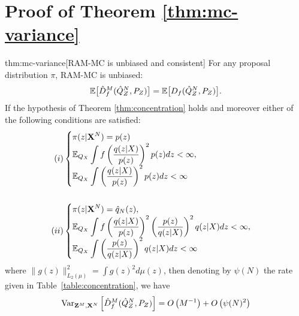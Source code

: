 \section{Proof of Theorem \ref{thm:mc-variance}}\label{appendix:full-statment-proof-mc}

\begin{reptheorem}{thm:mc-variance}[RAM-MC is unbiased and consistent]
For any proposal distribution $\pi$, RAM-MC is unbiased:
%
\begin{align*}
\mathbb{E}\bigl[\hat{D}^M_f( \hat{Q}_Z^N , P_Z)\bigr] =\mathbb{E}\bigl[D_f( \hat{Q}^N_{Z} , P_Z )\bigr].
\end{align*}
%
If the hypothesis of Theorem \ref{thm:concentration} holds and moreover either of the following conditions are satisfied:
\begin{align*}
(i)& \begin{cases}
\displaystyle \pi(z|\mathbf{X}^N) = p(z) \\
\displaystyle \mathbb{E}_{Q_X} \int f\left( \frac{q(z|X)}{p(z)}\right)^2 p(z) dz  < \infty, \\
\displaystyle \mathbb{E}_{Q_X} \int \left( \frac{q(z|X)}{p(z)} \right)^2 p(z) dz < \infty
\end{cases}\\ \ \\
(ii)& \begin{cases}
\displaystyle \pi(z | \mathbf{X}^N) = \hat{q}_N(z), \\
\displaystyle \mathbb{E}_{Q_X} \int f\left( \frac{q(z|X)}{p(z)}\right)^2 \left(\frac{p(z)}{q(z|X)}\right)^2 q(z|X) dz < \infty, \\
\displaystyle \mathbb{E}_{Q_X} \int \left(\frac{p(z)}{q(z|X)} \right)^2 q(z|X) dz < \infty
\end{cases}
\end{align*}
where $\| g(z) \|^2_{L_2(\mu)} = \int g(z)^2 d\mu(z)$,
then denoting by $\psi(N)$ the rate given in Table~\ref{table:concentration}, we have
\begin{align*}
    \text{Var}_{\mathbf{Z}^M, \mathbf{X}^N} \left[\hat{D}^M_f( \hat{Q}_Z^N , P_Z)  \right] = 
    O\left(M^{-1}\right) + O\left( \psi(N)^2 \right) 
\end{align*}
%
\end{reptheorem}

